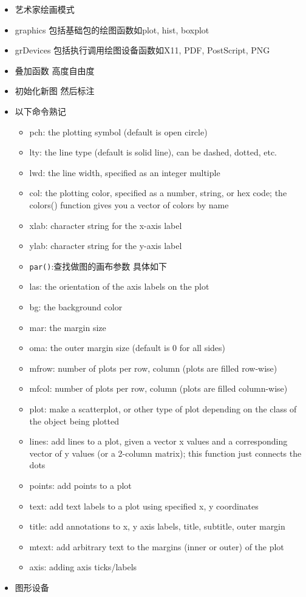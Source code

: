 \documentclass[]{book}
\providecommand{\tightlist}{%
  \setlength{\itemsep}{0pt}\setlength{\parskip}{0pt}}
\begin{document}
\begin{itemize}
\tightlist
\item
  艺术家绘画模式
\item
  graphics 包括基础包的绘图函数如plot, hist, boxplot
\item
  grDevices 包括执行调用绘图设备函数如X11, PDF, PostScript, PNG
\item
  叠加函数 高度自由度
\item
  初始化新图 然后标注
\item
  以下命令熟记

  \begin{itemize}
  \tightlist
  \item
    pch: the plotting symbol (default is open circle)
  \item
    lty: the line type (default is solid line), can be dashed, dotted, etc.
  \item
    lwd: the line width, specified as an integer multiple
  \item
    col: the plotting color, specified as a number, string, or hex code; the colors() function gives you a vector of colors by name
  \item
    xlab: character string for the x-axis label
  \item
    ylab: character string for the y-axis label
  \item
    \texttt{par()}:查找做图的画布参数 具体如下
  \item
    las: the orientation of the axis labels on the plot
  \item
    bg: the background color
  \item
    mar: the margin size
  \item
    oma: the outer margin size (default is 0 for all sides)
  \item
    mfrow: number of plots per row, column (plots are filled row-wise)
  \item
    mfcol: number of plots per row, column (plots are filled column-wise)
  \item
    plot: make a scatterplot, or other type of plot depending on the class of the object being plotted
  \item
    lines: add lines to a plot, given a vector x values and a corresponding vector of y values (or a 2-column matrix); this function just connects the dots
  \item
    points: add points to a plot
  \item
    text: add text labels to a plot using specified x, y coordinates
  \item
    title: add annotations to x, y axis labels, title, subtitle, outer margin
  \item
    mtext: add arbitrary text to the margins (inner or outer) of the plot
  \item
    axis: adding axis ticks/labels
  \end{itemize}
\item
  图形设备


\end{itemize}
\end{document}
